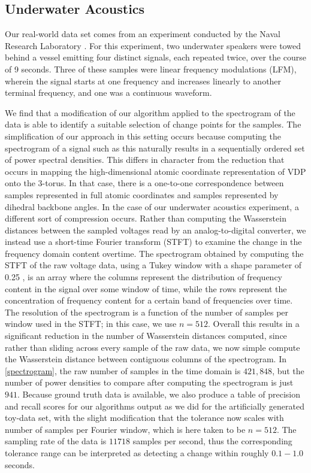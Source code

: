 \documentclass{article}
\begin{document}
\subsection{Underwater Acoustics}
\label{UWA}

 Our real-world data set comes from an experiment conducted by the Naval Research Laboratory \cite{turgutMeasuredDepthdependenceWaveguide2016}. For this experiment, two underwater speakers were towed behind a vessel emitting four distinct signals, each repeated twice, over the course of 9 seconds.  Three of these samples were linear frequency modulations (LFM), wherein the signal starts at one frequency and increases linearly to another terminal frequency, and one was a continuous waveform. 
 
 We find that a modification of our algorithm applied to the spectrogram of the data is able to identify a suitable selection of change points for the samples. The simplification of our approach in this setting occurs because computing the spectrogram of a signal such as this naturally results in a sequentially ordered set of power spectral densities.  This differs in character from the reduction that occurs in mapping the high-dimensional atomic coordinate representation of VDP onto the \(3\)-torus. In that case, there is a one-to-one correspondence between samples represented in full atomic coordinates and samples represented by dihedral backbone angles. In the case of our underwater acoustics experiment, a different sort of compression occurs. Rather than computing the Wasserstein distances between the sampled voltages read by an analog-to-digital converter, we instead use a short-time Fourier transform (STFT) to examine the change in the frequency domain content overtime. The spectrogram obtained by computing the STFT of the raw voltage data, using a Tukey window with a shape parameter of 0.25 \cite{virtanenSciPy10Fundamental2020}, is an array where the columns represent the distribution of frequency content in the signal over some window of time, while the rows represent the concentration of frequency content for a certain band of frequencies over time. The resolution of the spectrogram is a function of the number of samples per window used in the STFT; in this case, we use \(n=512\). Overall this results in a significant reduction in the number of Wasserstein distances computed, since rather than sliding across every sample of the raw data, we now simple compute the Wasserstein distance between contiguous columns of the spectrogram. In \ref{spectrogram}, the raw number of samples in the time domain is \(421,848\), but the number of power densities to compare after computing the spectrogram is just \(941\). Because ground truth data is available, we also produce a table of precision and recall scores for our algorithms output as we did for the artificially generated toy-data set, with the slight modification that the tolerance now scales with number of samples per Fourier window, which is here taken to be \(n=512\). The sampling rate of the data is \(11718\) samples per second, thus the corresponding tolerance range can be interpreted as detecting a change within roughly \(0.1-1.0\) seconds.
 
\end{document}
